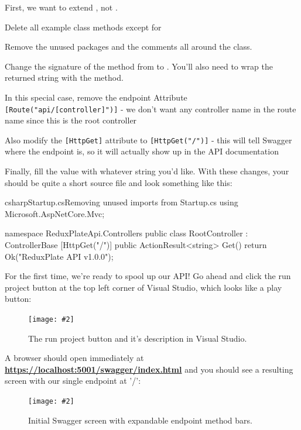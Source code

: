 \documentclass[paper=6in:9in,pagesize=pdftex,headinclude=on,footinclude=on,12pt,twoside]{scrbook}
\newcommand{\link}[2]{\textbf{\textcolor{monokaiPink}{\href{#2}{#1}}}}
\newcommand{\standardfigure}[3]{\begin{figure}[H]\begin{center}\texttt{[image: \#2]}\caption{#3}\label{fig:#2}\end{center}\end{figure}}
\begin{document}
\begin{arrows}
\item First, we want to extend , not . 
\item Delete all example class methods except for 
\item Remove the unused packages and the comments all around the class.
\item Change the signature of the  method from  to . You'll also need to wrap the returned string with the  method.
\item In this special case, remove the endpoint Attribute \texttt{[Route("api/[controller]")]} - we don't want any controller name in the route name since this is the root controller
\item Also modify the \texttt{[HttpGet]} attribute to \texttt{[HttpGet("/")]} - this will tell Swagger where the endpoint is, so it will actually show up in the API documentation
\end{arrows}

Finally, fill the  value with whatever string you'd like. With these changes, your  should be quite a short source file and look something like this:

\begin{codeInput}{csharp}{Startup.cs}{Removing unused imports from Startup.cs}
using Microsoft.AspNetCore.Mvc;

namespace ReduxPlateApi.Controllers
{
    public class RootController : ControllerBase
    {
        [HttpGet("/")]
        public ActionResult<string> Get()
        {
            return Ok("ReduxPlate API v1.0.0");
        }
    }
}  
\end{codeInput}

For the first time, we're ready to spool up our API! Go ahead and click the run project button at the top left corner of Visual Studio, which looks like a play button:

\standardfigure{\textwidth}{backend/run-project-button}{The run project button and it's description in Visual Studio.}

A browser should open immediately at \link{https://localhost:5001/swagger/index.html}{https://localhost:5001/swagger/index.html} and you should see a resulting screen with our single endpoint at '/':

\standardfigure{\textwidth}{backend/swagger-initial}{Initial Swagger screen with expandable endpoint method bars.}
\end{document}
